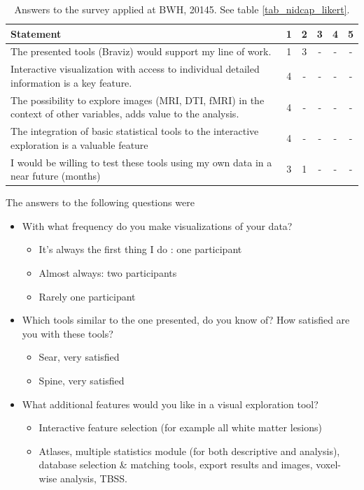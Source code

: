 \begin{table}
	\centering
		\begin{tabular}{p{}ccccc}
			\toprule
			Statement&1&2&3&4&5 \\
			\midrule
			The presented tools (Braviz) would support my line of work. & 1 & 3 &-& - & - \\
			Interactive visualization with access to individual detailed information is a key feature. &4&-&-&-&- \\			
			The possibility to explore images (MRI, DTI, fMRI) in the context of other variables, adds value to the analysis. &4&-&-&-&- \\
			The integration of basic statistical tools to the interactive exploration is a valuable feature &4&-&-&-&- \\
			I would be willing to test these tools using my own data in a near future (months) & 3 & 1 & - &-&- \\
			\bottomrule
		\end{tabular}
	\caption{Answers to the survey applied at BWH, 20145. See table \ref{tab_nidcap_likert}.}
	\label{tab_bwh_likert}
\end{table}

The answers to the following questions were

\begin{itemize}
	\item With what frequency do you make visualizations of your data?
	\begin{itemize}
		\item It's always the first thing I do : one participant
		\item Almost always: two participants
		\item Rarely one participant
	\end{itemize}
	\item Which tools similar to the one presented, do you know of? How satisfied are you with these tools?
	\begin{itemize}
		\item Sear, very satisfied
		\item Spine, very satisfied
	\end{itemize}
	\item What additional features would you  like in a visual exploration tool?
	\begin{itemize}
		\item Interactive feature selection (for example all white matter lesions)
		\item Atlases, multiple statistics module (for both descriptive and analysis), database selection \& matching tools, export results and images, voxel-wise analysis, TBSS.
	\end{itemize}	
\end{itemize}

